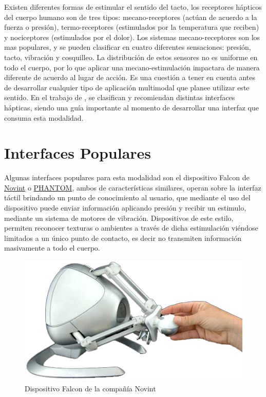 Existen diferentes formas de estimular el sentido del tacto, los receptores hápticos del cuerpo humano son de tres tipos: mecano-receptores (actúan de acuerdo a la fuerza o presión), termo-receptores (estimulados por la temperatura que reciben) y nociceptores (estimulados por el dolor).
Los sistemas mecano-receptores son los mas populares, y se pueden clasificar en cuatro diferentes sensaciones: presión, tacto, vibración y cosquilleo. La distribución de estos sensores no es uniforme en todo el cuerpo, por lo que aplicar una mecano-estimulación impactara de manera diferente de acuerdo al lugar de acción. Es una cuestión a tener en cuenta antes de desarrollar cualquier tipo de aplicación multimodal que planee utilizar este sentido. En el trabajo de \citet{hale2004deriving}, se clasifican y recomiendan distintas interfaces hápticas, siendo una guía importante al momento de desarrollar una interfaz que consuma esta modalidad.

\section{Interfaces Populares}
Algunas interfaces populares para esta modalidad son el dispositivo Falcon de \href{http://www.novint.com/index.php/novintfalcon}{Novint} o \href{http://www.dentsable.com/haptic-phantom-desktop.htm}{PHANTOM}, ambos de características similares, operan sobre la interfaz táctil brindando un punto de conocimiento al usuario, que mediante el uso del dispositivo puede enviar información aplicando presión y recibir un estimulo, mediante un sistema de motores de vibración. Dispositivos de este estilo, permiten reconocer texturas o ambientes a través de dicha estimulación viéndose limitados a un único punto de contacto, es decir no transmiten información masivamente a todo el cuerpo.

\begin{center}
  \begin{figure}[h]
    \includegraphics[scale=1,width=\textwidth]{gfx/novint1xe6}
    \caption{Dispositivo Falcon de la compañía Novint}
    \label{fig:apx_novint}
  \end{figure}
\end{center}

